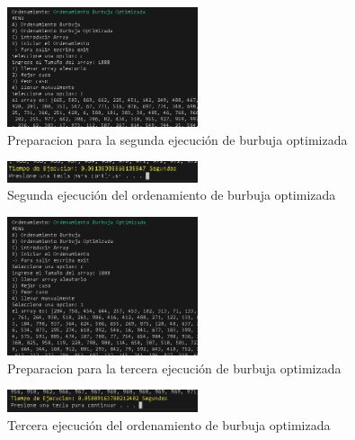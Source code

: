\documentclass[journal]{IEEEtran}
\begin{document}
  \begin{figure}[H]
    \centering
    \begin{adjustbox}{clip=false}
      \includegraphics[width=0.5\textwidth]{16.PNG}
    \end{adjustbox}
    \caption{Preparacion para la segunda ejecución de burbuja optimizada}
  \end{figure}
  \begin{figure}[H]
    \centering
    \begin{adjustbox}{clip=false}
      \includegraphics[width=0.5\textwidth]{17.PNG}
    \end{adjustbox}
    \caption{Segunda ejecución del ordenamiento de burbuja optimizada}
  \end{figure}
  \begin{figure}[H]
    \centering
    \begin{adjustbox}{clip=false}
      \includegraphics[width=0.5\textwidth]{18.PNG}
    \end{adjustbox}
    \caption{Preparacion para la tercera ejecución de burbuja optimizada}
  \end{figure}
  \begin{figure}[H]
    \centering
    \begin{adjustbox}{clip=false}
      \includegraphics[width=0.5\textwidth]{19.PNG}
    \end{adjustbox}
    \caption{Tercera ejecución del ordenamiento de burbuja optimizada}
  \end{figure}
\end{document}
